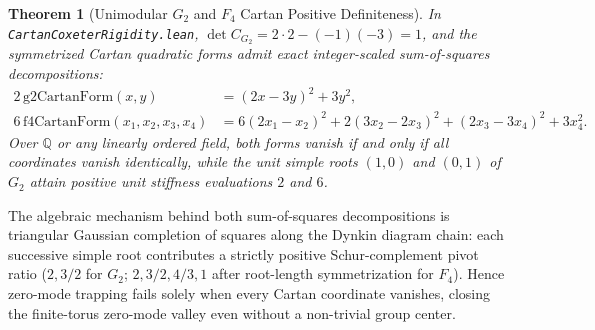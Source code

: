 \documentclass[11pt,a4paper]{article}
\newtheorem{theorem}{Theorem}[section]
\newcommand{\Q}{\mathbb{Q}}
\begin{document}
\begin{theorem}[Unimodular $G_2$ and $F_4$ Cartan Positive Definiteness]
In \texttt{Cartan\-Coxeter\-Rigidity.lean}, $\det C_{G_2} = 2 \cdot 2 - (-1)(-3) = 1$, and the symmetrized Cartan quadratic forms admit exact integer-scaled sum-of-squares decompositions:
\begin{align}
2 \, \mathrm{g2CartanForm}(x, y) &= (2x - 3y)^2 + 3y^2, \\
6 \, \mathrm{f4CartanForm}(x_1, x_2, x_3, x_4) &= 6(2x_1 - x_2)^2 + 2(3x_2 - 2x_3)^2 + (2x_3 - 3x_4)^2 + 3x_4^2.
\end{align}
Over $\Q$ or any linearly ordered field, both forms vanish if and only if all coordinates vanish identically, while the unit simple roots $(1, 0)$ and $(0, 1)$ of $G_2$ attain positive unit stiffness evaluations $2$ and $6$.
\end{theorem}

The algebraic mechanism behind both sum-of-squares decompositions is triangular Gaussian completion of squares along the Dynkin diagram chain: each successive simple root contributes a strictly positive Schur-complement pivot ratio ($2, 3/2$ for $G_2$; $2, 3/2, 4/3, 1$ after root-length symmetrization for $F_4$). Hence zero-mode trapping fails solely when every Cartan coordinate vanishes, closing the finite-torus zero-mode valley even without a non-trivial group center.
\end{document}
